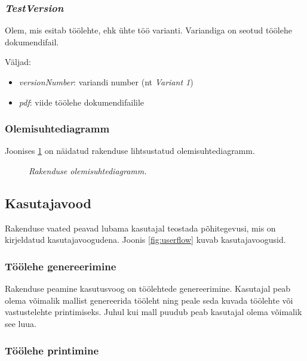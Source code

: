\subsubsection{\emph{TestVersion}}

Olem, mis esitab töölehte, ehk ühte töö varianti. Variandiga on seotud töölehe dokumendifail.

Väljad:

\begin{itemize}
  \item \emph{versionNumber}: variandi number (nt \emph{Variant 1})
  \item \emph{pdf}: viide töölehe dokumendifailile
\end{itemize}

\subsubsection{Olemisuhtediagramm}

Joonises \ref{fig:uml} on näidatud rakenduse lihtsustatud olemisuhtediagramm.

\begin{figure}
\begin{adjustbox}{width=\textwidth}

\end{adjustbox}
\caption{\emph{Rakenduse olemisuhtediagramm.}}\label{fig:uml}
\end{figure}

\subsection{Kasutajavood}

Rakenduse vaated peavad lubama kasutajal teostada põhitegevusi, mis on kirjeldatud kasutajavoogudena. Joonis \ref{fig:userflow} kuvab kasutajavoogusid.

\subsubsection{Töölehe genereerimine}

Rakenduse peamine kasutusvoog on töölehtede genereerimine. Kasutajal peab olema võimalik mallist genereerida tööleht ning peale seda kuvada töölehte või vastustelehte printimiseks. Juhul kui mall puudub peab kasutajal olema võimalik see luua.

\subsubsection{Töölehe printimine}


